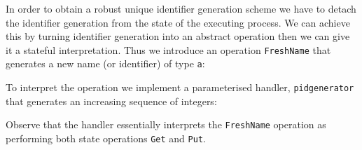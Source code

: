 \documentclass[12pt,mscres,cdtppar,twoside,openright,logo,rightchapter,normalheadings]{infthesis}
\newcommand{\snippet}[1]{}
\theoremstyle{definition}
\newcommand{\todo}[1]{{\par\noindent\small\color{red} \framebox{\parbox{\dimexpr\linewidth-2\fboxsep-2\fboxrule}{\textbf{TODO:} #1}}}}
\begin{document}


In order to obtain a robust unique identifier generation scheme we
have to detach the identifier generation from the state of the
executing process. We can achieve this by turning identifier
generation into an abstract operation then we can give it a stateful
interpretation. Thus we introduce an operation \lstinline$FreshName$
that generates a new name (or identifier) of type \lstinline$a$:
%
\snippet{freshname.links}
%
To interpret the operation we implement a parameterised handler,
\lstinline$pidgenerator$ that generates an increasing sequence of
integers:
%
\snippet{freshnames.links}
%
Observe that the handler essentially interprets the
\lstinline$FreshName$ operation as performing both state operations
\lstinline$Get$ and \lstinline$Put$. 
\end{document}
